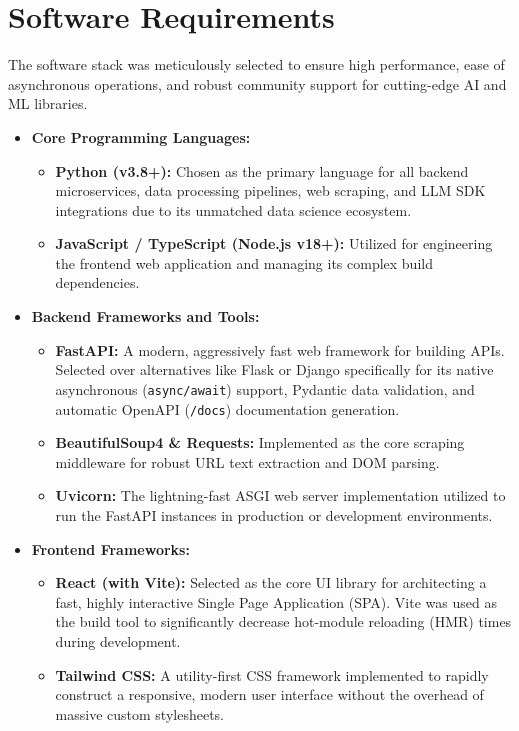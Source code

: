 \section{Software Requirements}
The software stack was meticulously selected to ensure high performance, ease of asynchronous operations, and robust community support for cutting-edge AI and ML libraries.

\begin{itemize}
    \item \textbf{Core Programming Languages:}
    \begin{itemize}
        \item \textbf{Python (v3.8+):} Chosen as the primary language for all backend microservices, data processing pipelines, web scraping, and LLM SDK integrations due to its unmatched data science ecosystem.
        \item \textbf{JavaScript / TypeScript (Node.js v18+):} Utilized for engineering the frontend web application and managing its complex build dependencies.
    \end{itemize}
    
    \item \textbf{Backend Frameworks and Tools:}
    \begin{itemize}
        \item \textbf{FastAPI:} A modern, aggressively fast web framework for building APIs. Selected over alternatives like Flask or Django specifically for its native asynchronous (\texttt{async/await}) support, Pydantic data validation, and automatic OpenAPI (\texttt{/docs}) documentation generation.
        \item \textbf{BeautifulSoup4 \& Requests:} Implemented as the core scraping middleware for robust URL text extraction and DOM parsing.
        \item \textbf{Uvicorn:} The lightning-fast ASGI web server implementation utilized to run the FastAPI instances in production or development environments.
    \end{itemize}
    
    \item \textbf{Frontend Frameworks:}
    \begin{itemize}
        \item \textbf{React (with Vite):} Selected as the core UI library for architecting a fast, highly interactive Single Page Application (SPA). Vite was used as the build tool to significantly decrease hot-module reloading (HMR) times during development.
        \item \textbf{Tailwind CSS:} A utility-first CSS framework implemented to rapidly construct a responsive, modern user interface without the overhead of massive custom stylesheets.
    \end{itemize}
    

\end{itemize}
